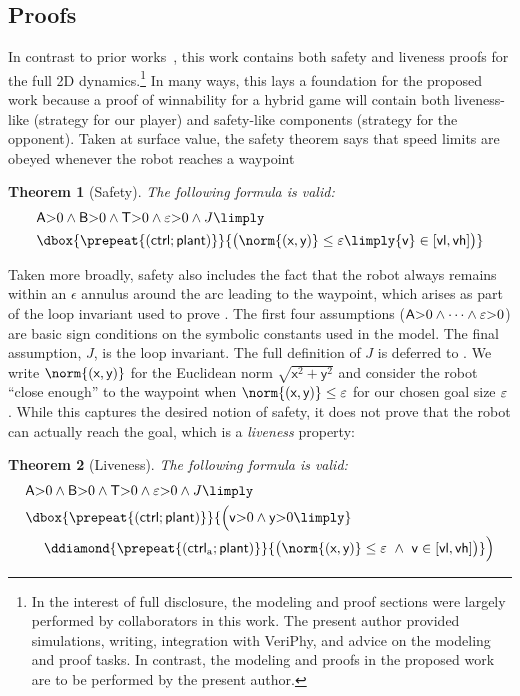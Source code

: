 \documentclass[12pt]{cmuthesis}
\newtheorem{theorem}{Theorem}
\theoremstyle{definition}
\theoremstyle{remark}
\newcommand{\xgvar}{\textsf{x}}
\newcommand{\ygvar}{\textsf{y}}
\newcommand{\yvar}{\textsf{y}}
\newcommand{\vlvar}{\textsf{vl}}
\newcommand{\vhvar}{\textsf{vh}}
\newcommand{\Tvar}{{\sf T}\xspace}
\newcommand{\Avar}{{\sf A}\xspace}
\newcommand{\Bvar}{{\sf B}\xspace}
\newcommand{\vvar}{{\sf v}\xspace}
\newcommand{\avar}{{\sf a}\xspace}
\newcommand{\ctrl}{\textsf{ctrl}\xspace}
\newcommand{\ctrlliv}{\ctrl_{\text{a}}}
\newcommand{\plant}{\textsf{plant}\xspace}
\newcommand{\enorm}[1]{\norm{#1}}
\newcommand{\linv}{J}
\newcommand{\rref}[2][]{\prettyref{#2}}
\newcommand{\VeriPhy}{VeriPhy\xspace}
\begin{document}
\subsection{Proofs}
In contrast to prior works~\cite{DBLP:journals/ijrr/MitschGVP17}, this work contains both safety and liveness proofs for the full 2D dynamics.\footnote{In the interest of full disclosure, the modeling and proof sections were largely performed by collaborators in this work. The present author provided simulations, writing, integration with \VeriPhy, and advice on the modeling and proof tasks. In contrast, the modeling and proofs in the proposed work are to be performed by the present author.}
In many ways, this lays a foundation for the proposed work because a proof of winnability for a hybrid game will contain both liveness-like (strategy for our player) and safety-like components (strategy for the opponent).
Taken at surface value, the safety theorem says that speed limits are obeyed whenever the robot reaches a waypoint
\begin{theorem}[Safety]
\label{thm:safe}
The following \dL formula is valid:
\begin{align*}
&\Avar{>}0 \land \Bvar{>}0 \land \Tvar{>}0 \land \veps{>}0 \land \linv \limply \\
&\dbox{\prepeat{(\ctrl;\plant)}}{\big(\enorm{(\xgvar,\ygvar)} \leq \veps \limply \vvar \in [\vlvar,\vhvar]\big)}
\end{align*}
\end{theorem}
Taken more broadly, safety also includes the fact that the robot always remains within an $\epsilon$ annulus around the arc leading to the waypoint, which arises as part of the loop invariant used to prove \rref{thm:safe}.
The first four assumptions ($\Avar{>}0 \land \dots \land \veps{>}0$) are basic sign conditions on the symbolic constants used in the model. 
The final assumption, $\linv$, is the loop invariant.
The full definition of $\linv$ is deferred to \rref{sec:ground-robotics}.
We write $\enorm{(\xgvar,\ygvar)}$ for the Euclidean norm $\sqrt{\xgvar^2 + \ygvar^2}$ and consider the robot ``close enough'' to the waypoint when $\enorm{(\xgvar,\ygvar)} \leq \veps$ for our chosen goal size $\varepsilon$.
While this captures the desired notion of safety, it does not prove that the robot can actually reach the goal, which is a \emph{liveness} property:
\begin{theorem}[Liveness]
\label{thm:liveness}
The following \dL formula is valid:
\begin{align*}
&\Avar{>}0 \land \Bvar{>}0 \land \Tvar{>}0 \land \veps{>}0 \land \linv \limply \\
&\dbox{\prepeat{(\ctrl;\plant)}}{\Big( \vvar{>}0 \land \yvar{>}0 \limply }\\
&\ \ \ \ \ddiamond{\prepeat{(\ctrlliv;\plant)}}{\big(\enorm{(\xgvar,\ygvar)} \leq \veps~\land~\vvar \in [\vlvar,\vhvar]\big)} \Big)
\end{align*}
\end{theorem}
\end{document}
